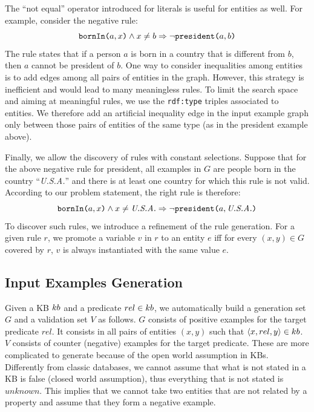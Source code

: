 \vspace{0.5ex}
The ``not equal'' operator introduced for literals is useful for entities as well. 
For example, consider the negative rule:
$$ \texttt{bornIn(}a,x\texttt{)} \wedge x \neq b \Rightarrow \neg \texttt{president(}a,b\texttt{)} $$
The rule states that if a person $a$ is born in a country that is different from $b$, then $a$ cannot be president of $b$.
One way to consider inequalities among entities is to add edges among all pairs of entities in the graph. However, this strategy is inefficient and would lead to many meaningless rules. To limit the search space and aiming at meaningful rules, we use the \texttt{rdf:type} triples associated to entities. We therefore add an artificial inequality edge in the input example graph only between those pairs of entities of the same type (as in the president example above). %

\vspace{0.5ex}
Finally, we allow the discovery of rules with constant selections. %
Suppose that for the above negative rule for president, all examples in $G$ are people born in the country ``\textit{U.S.A.}'' and there is at least one country for which this rule is not valid. According to our problem statement, the right rule is therefore:
%
$$ \texttt{bornIn(}a,x\texttt{)} \wedge x \neq \emph{U.S.A.} \Rightarrow \neg \texttt{president(}a,\emph{U.S.A.}\texttt{)} $$
%
To discover such rules, we introduce a refinement of the rule generation.
For a given rule $r$, we promote a variable $v$ in $r$ to an entity $e$ iff for every $(x,y) \in G$ covered by $r$, $v$ is always instantiated with the same value $e$. 


\subsection{Input Examples Generation} \label{sec:ex_generation}
Given a KB ${\sc kb}$ and a predicate $rel \in {\sc kb}$, we automatically build a generation set $G$ and a validation set $V$ as follows. 
$G$ consists of positive examples for the target predicate $rel$. It consists in all pairs of entities $(x,y)$ such that $\langle x,rel,y\rangle \in {\sc kb}$.
$V$ consists of counter (negative) examples for the target predicate.
These are more complicated to generate because of the open world assumption in KBs. 
Differently from classic databases, we cannot assume that what is not stated in a KB is false (closed world assumption), thus everything that is not stated is $unknown$.%
This implies that we cannot take two entities that are not related by a property and assume that they form a negative example. 

